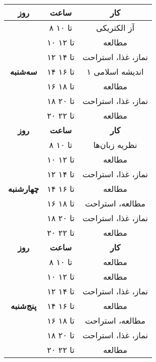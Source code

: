 \documentclass{article}
\begin{document}
\begin{center}
\begin{longtable}{|c|c|c|}
				\textbf{روز} & \textbf{ساعت} & \textbf{کار} \\
				\hline
			
				\multirow{7}{*}{\textbf{سه‌شنبه}} 				
			    & ۸ تا ۱۰ & آز الکتریکی \\
				\cline{2-3}				
				& ۱۰ تا ۱۲ & مطالعه \\
				\cline{2-3}				
				& ۱۲ تا ۱۴ & نماز، غذا، استراحت \\
				\cline{2-3}				
				& ۱۴ تا ۱۶ & اندیشه اسلامی ۱ \\
				\cline{2-3}				
				& ۱۶ تا ۱۸ & مطالعه \\
				\cline{2-3}				
				& ۱۸ تا ۲۰ & نماز، غذا، استراحت \\
				\cline{2-3}				
				& ۲۰ تا ۲۲ & مطالعه \\
		      	\hline
		      	
				\newpage
				
				\hline
				\textbf{روز} & \textbf{ساعت} & \textbf{کار} \\
				\hline
			
				\multirow{7}{*}{\textbf{چهارشنبه}} 				
			    & ۸ تا ۱۰ & نظریه زبان‌ها \\ 
			    \cline{2-3}
			    & ۱۰ تا ۱۲ & مطالعه \\
				\cline{2-3}				
				& ۱۲ تا ۱۴ & نماز، غذا، استراحت \\
				\cline{2-3}				
				& ۱۴ تا ۱۶ & مطالعه \\
				\cline{2-3}				
				& ۱۶ تا ۱۸ & مطالعه، استراحت \\
				\cline{2-3}				
				& ۱۸ تا ۲۰ & نماز، غذا، استراحت \\
				\cline{2-3}				
				& ۲۰ تا ۲۲ & مطالعه \\
				\hline \hline
				
				\textbf{روز} & \textbf{ساعت} & \textbf{کار} \\
				\hline
				
				\multirow{7}{*}{\textbf{پنج‌شنبه}} 				
				& ۸ تا ۱۰ & مطالعه \\ 
				\cline{2-3}
				& ۱۰ تا ۱۲ & مطالعه \\
				\cline{2-3}				
				& ۱۲ تا ۱۴ & نماز، غذا، استراحت \\
				\cline{2-3}				
				& ۱۴ تا ۱۶ & مطالعه \\
				\cline{2-3}				
				& ۱۶ تا ۱۸ & مطالعه، استراحت \\
				\cline{2-3}				
				& ۱۸ تا ۲۰ & نماز، غذا، استراحت \\
				\cline{2-3}				
				& ۲۰ تا ۲۲ & مطالعه \\
				\hline				
		\end{longtable}
	\end{center}
\end{document}
